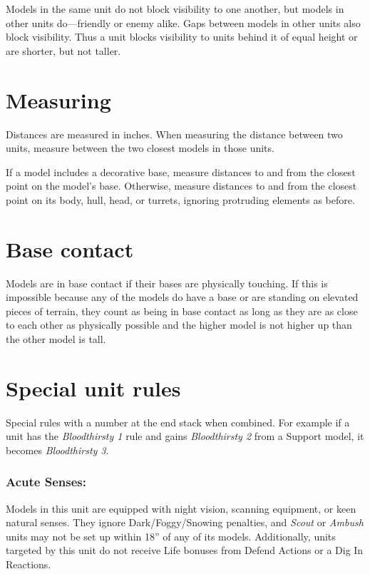 \begin{multicols}{2}
Models in the same unit do not block visibility to one another, but models in other units do—friendly or enemy alike. Gaps between models in other units also block visibility. Thus a unit blocks visibility to units behind it of equal height or are shorter, but not taller.




\section*{Measuring}

Distances are measured in inches. When measuring the distance between two units, measure between the two closest models in those units.

If a model includes a decorative base, measure distances to and from the closest point on the model's base. Otherwise, measure distances to and from the closest point on its body, hull, head, or turrets, ignoring protruding elements as before.






\section*{Base contact}

Models are in base contact if their bases are physically touching. If this is impossible because any of the models do have a base or are standing on elevated pieces of terrain, they count as being in base contact as long as they are as close to each other as physically possible and the higher model is not higher up than the other model is tall.




\section*{Special unit rules}

Special rules with a number at the end stack when combined. For example if a unit has the \textit{Bloodthirsty 1} rule and gains \textit{Bloodthirsty 2} from a Support model, it becomes \textit{Bloodthirsty 3}.

\subsubsection*{Acute Senses:} Models in this unit are equipped with night vision, scanning equipment, or keen natural senses. They ignore Dark/Foggy/Snowing penalties, and \textit{Scout} or \textit{Ambush} units may not be set up within 18'' of any of its models. Additionally, units targeted by this unit do not receive Life bonuses from Defend Actions or a Dig In Reactions.


\end{multicols}
